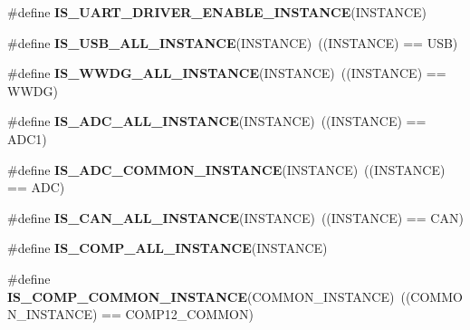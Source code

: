 \begin{DoxyCompactItemize}
\#define {\bfseries I\+S\+\_\+\+U\+A\+R\+T\+\_\+\+D\+R\+I\+V\+E\+R\+\_\+\+E\+N\+A\+B\+L\+E\+\_\+\+I\+N\+S\+T\+A\+N\+CE}(I\+N\+S\+T\+A\+N\+CE)
\item 
\mbox{\label{group___exported__macro_ga763f287042e73e61b91e12bb065777cd}} 
\#define {\bfseries I\+S\+\_\+\+U\+S\+B\+\_\+\+A\+L\+L\+\_\+\+I\+N\+S\+T\+A\+N\+CE}(I\+N\+S\+T\+A\+N\+CE)~((I\+N\+S\+T\+A\+N\+CE) == U\+SB)
\item 
\mbox{\label{group___exported__macro_gac2a8aaec233e19987232455643a04d6f}} 
\#define {\bfseries I\+S\+\_\+\+W\+W\+D\+G\+\_\+\+A\+L\+L\+\_\+\+I\+N\+S\+T\+A\+N\+CE}(I\+N\+S\+T\+A\+N\+CE)~((I\+N\+S\+T\+A\+N\+CE) == W\+W\+DG)
\item 
\mbox{\label{group___exported__macro_ga2204b62b378bcf08b3b9006c184c7c23}} 
\#define {\bfseries I\+S\+\_\+\+A\+D\+C\+\_\+\+A\+L\+L\+\_\+\+I\+N\+S\+T\+A\+N\+CE}(I\+N\+S\+T\+A\+N\+CE)~((I\+N\+S\+T\+A\+N\+CE) == A\+D\+C1)
\item 
\mbox{\label{group___exported__macro_gad8a5831c786b6b265531b890a194cbe2}} 
\#define {\bfseries I\+S\+\_\+\+A\+D\+C\+\_\+\+C\+O\+M\+M\+O\+N\+\_\+\+I\+N\+S\+T\+A\+N\+CE}(I\+N\+S\+T\+A\+N\+CE)~((I\+N\+S\+T\+A\+N\+CE) == A\+DC)
\item 
\mbox{\label{group___exported__macro_ga974dd363bcb2a5f48ec032509fd4ece3}} 
\#define {\bfseries I\+S\+\_\+\+C\+A\+N\+\_\+\+A\+L\+L\+\_\+\+I\+N\+S\+T\+A\+N\+CE}(I\+N\+S\+T\+A\+N\+CE)~((I\+N\+S\+T\+A\+N\+CE) == C\+AN)
\item 
\#define {\bfseries I\+S\+\_\+\+C\+O\+M\+P\+\_\+\+A\+L\+L\+\_\+\+I\+N\+S\+T\+A\+N\+CE}(I\+N\+S\+T\+A\+N\+CE)
\item 
\mbox{\label{group___exported__macro_gaa7c8a0729f6b2a35ce000556078fa737}} 
\#define {\bfseries I\+S\+\_\+\+C\+O\+M\+P\+\_\+\+C\+O\+M\+M\+O\+N\+\_\+\+I\+N\+S\+T\+A\+N\+CE}(C\+O\+M\+M\+O\+N\+\_\+\+I\+N\+S\+T\+A\+N\+CE)~((C\+O\+M\+M\+O\+N\+\_\+\+I\+N\+S\+T\+A\+N\+CE) == C\+O\+M\+P12\+\_\+\+C\+O\+M\+M\+ON)
\item 
\mbox{\label{group___exported__macro_gaf2340c4592a47c171624fc99e43e4da5}} 

\end{DoxyCompactItemize}
